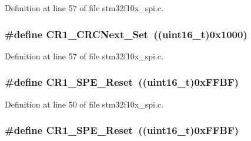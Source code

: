 Definition at line 57 of file stm32f10x\+\_\+spi.\+c.

\subsubsection[{\texorpdfstring{C\+R1\+\_\+\+C\+R\+C\+Next\+\_\+\+Set}{CR1_CRCNext_Set}}]{\setlength{\rightskip}{0pt plus 5cm}\#define C\+R1\+\_\+\+C\+R\+C\+Next\+\_\+\+Set~(({\bf uint16\+\_\+t})0x1000)}\hypertarget{group___s_p_i___private___defines_gaed3a2181ca4095a6488cf6c0ad7a29c6}{}\label{group___s_p_i___private___defines_gaed3a2181ca4095a6488cf6c0ad7a29c6}


Definition at line 57 of file stm32f10x\+\_\+spi.\+c.

\subsubsection[{\texorpdfstring{C\+R1\+\_\+\+S\+P\+E\+\_\+\+Reset}{CR1_SPE_Reset}}]{\setlength{\rightskip}{0pt plus 5cm}\#define C\+R1\+\_\+\+S\+P\+E\+\_\+\+Reset~(({\bf uint16\+\_\+t})0x\+F\+F\+B\+F)}\hypertarget{group___s_p_i___private___defines_ga7074d384e7f175968d1497a9275232bf}{}\label{group___s_p_i___private___defines_ga7074d384e7f175968d1497a9275232bf}


Definition at line 50 of file stm32f10x\+\_\+spi.\+c.

\subsubsection[{\texorpdfstring{C\+R1\+\_\+\+S\+P\+E\+\_\+\+Reset}{CR1_SPE_Reset}}]{\setlength{\rightskip}{0pt plus 5cm}\#define C\+R1\+\_\+\+S\+P\+E\+\_\+\+Reset~(({\bf uint16\+\_\+t})0x\+F\+F\+B\+F)}\hypertarget{group___s_p_i___private___defines_ga7074d384e7f175968d1497a9275232bf}{}\label{group___s_p_i___private___defines_ga7074d384e7f175968d1497a9275232bf}


